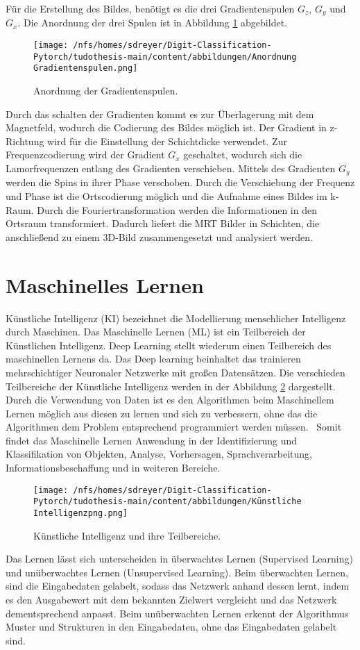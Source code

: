 Für die Erstellung des Bildes, benötigt es die drei Gradientenspulen $G_z$, $G_y$ und $G_x$. Die Anordnung der drei Spulen 
ist in Abbildung \ref{fig:an Grad} abgebildet.
\begin{figure}[H]
  \centering
  \texttt{[image: /nfs/homes/sdreyer/Digit-Classification-Pytorch/tudothesis-main/content/abbildungen/Anordnung Gradientenspulen.png]}
  \caption{Anordnung der Gradientenspulen.\cite{Schlegel}}
  \label{fig:an Grad}
\end{figure}
Durch das schalten der Gradienten kommt es zur Überlagerung mit dem Magnetfeld, wodurch die Codierung des Bildes möglich ist.
Der Gradient in z-Richtung wird für die Einstellung der Schichtdicke verwendet. 
Zur Frequenzcodierung wird der Gradient $G_x$ geschaltet, wodurch sich die Lamorfrequenzen entlang des Gradienten verschieben.
Mittels des Gradienten $G_y$ werden die Spins in ihrer Phase verschoben.
Durch die Verschiebung der Frequenz und Phase ist die Ortscodierung möglich und die Aufnahme eines Bildes im k-Raum.
Durch die Fouriertransformation werden die Informationen in den Ortsraum transformiert.
Dadurch liefert die MRT Bilder in Schichten, die anschließend zu einem 3D-Bild zusammengesetzt und analysiert werden.~\cite{pabst2013}
\section{Maschinelles Lernen}
Künstliche Intelligenz (KI) bezeichnet die Modellierung menschlicher Intelligenz durch Maschinen. 
Das Maschinelle Lernen (ML) ist ein Teilbereich der Künstlichen Intelligenz. Deep Learning stellt 
wiederum einen Teilbereich des maschinellen Lernens da. Das Deep learning beinhaltet das trainieren mehrschichtiger Neuronaler Netzwerke mit großen Datensätzen.
Die verschieden Teilbereiche der Künstliche Intelligenz werden in der Abbildung \ref{fig:KI} dargestellt.
Durch die Verwendung von Daten ist es den Algorithmen beim 
Maschinellem Lernen möglich aus diesen zu lernen und sich zu verbessern, ohne das die Algorithmen dem Problem entsprechend programmiert werden müssen.~\cite{kleesiek2020}
Somit findet das Maschinelle Lernen Anwendung in der Identifizierung und Klassifikation von Objekten, Analyse, Vorhersagen, 
Sprachverarbeitung, Informationsbeschaffung und in weiteren Bereiche.~\cite{shinde2018}
\begin{figure}[H]
  \centering
  \texttt{[image: /nfs/homes/sdreyer/Digit-Classification-Pytorch/tudothesis-main/content/abbildungen/Künstliche Intelligenzpng.png]}
  \caption{Künstliche Intelligenz und ihre Teilbereiche.~\cite{kleesiek2020}}
  \label{fig:KI}
\end{figure}
Das Lernen lässt sich unterscheiden in überwachtes Lernen (Supervised Learning) und unüberwachtes Lernen (Unsupervised Learning).
Beim überwachten Lernen, sind die Eingabedaten gelabelt, sodass das Netzwerk anhand dessen lernt, indem es den Ausgabewert mit dem bekannten Zielwert 
vergleicht und das Netzwerk dementsprechend anpasst.
Beim unüberwachten Lernen erkennt der Algorithmus Muster und Strukturen in den Eingabedaten, ohne das Eingabedaten gelabelt sind.~\cite{kleesiek2020}
